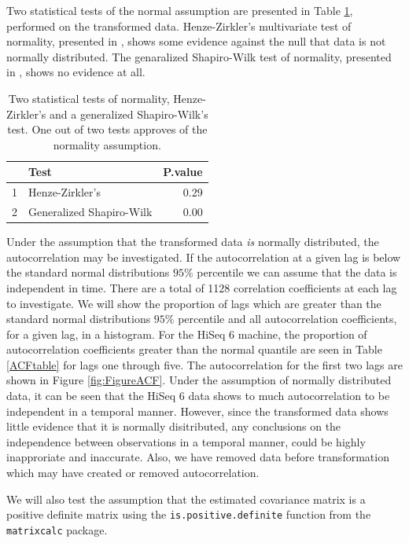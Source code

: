 \documentclass[a4paper,11pt,fleqn,twoside,notitlepage]{report}\usepackage[]{graphicx}\usepackage[]{color}
\begin{document}
Two statistical tests of the normal assumption are presented in Table \ref{TestTable}, performed on the transformed data. Henze-Zirkler's multivariate test of normality, presented in \citet{HenzeZirkler}, shows some evidence against the null that data is not normally distributed. The genaralized Shapiro-Wilk test of normality, presented in \citet{GenShapWilk}, shows no evidence at all.
\begin{table}[ht]
\centering
\begin{tabular}{rlr}
  \hline
 & Test & P.value \\ 
  \hline
1 & Henze-Zirkler's & 0.29 \\ 
  2 & Generalized Shapiro-Wilk & 0.00 \\ 
   \hline
\end{tabular}
\caption{Two statistical tests of normality, Henze-Zirkler's and a generalized Shapiro-Wilk's test. One out of two tests approves of the normality assumption.} 
\label{TestTable}
\end{table}

Under the assumption that the transformed data \textit{is} normally distributed, the autocorrelation may be investigated. If the autocorrelation at a given lag is below the standard normal distributions $95\%$ percentile we can assume that the data is independent in time. There are a total of 1128 correlation coefficients at each lag to investigate. We will show the proportion of lags which are greater than the standard normal distributions $95\%$ percentile and all autocorrelation coefficients, for a given lag, in a histogram. 
For the HiSeq 6 machine, the proportion of autocorrelation coefficients greater than the normal quantile are seen in Table \ref{ACFtable} for lags one through five. The autocorrelation for the first two lags are shown in Figure \ref{fig:FigureACF}. Under the assumption of normally distributed data, it can be seen that the HiSeq 6 data shows to much autocorrelation to be independent in a temporal manner. However, since the transformed data shows little evidence that it is normally disitributed, any conclusions on the independence between observations in a temporal manner, could be highly inapproriate and inaccurate. Also, we have removed data before transformation which may have created or removed autocorrelation. 

We will also test the assumption that the estimated covariance matrix is a positive definite matrix using the \texttt{is.positive.definite} function from the \texttt{matrixcalc} package. 
\end{document}
